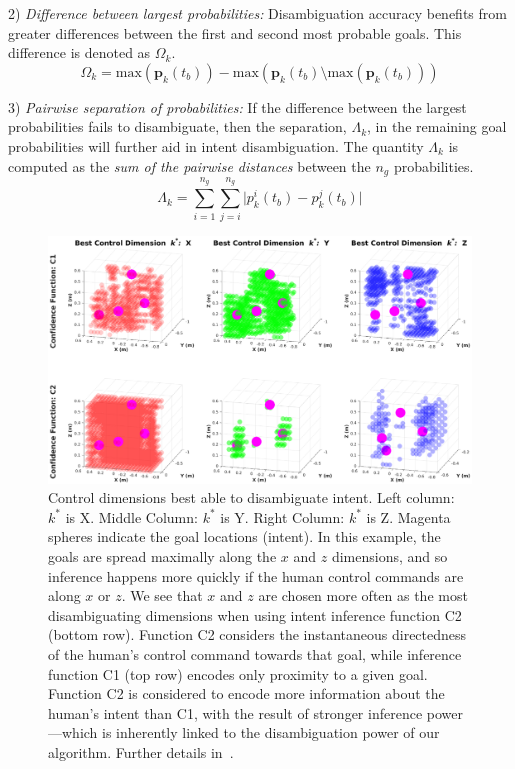 \documentclass[natbib, twocolumn]{svjour3}          %
\begin{document}
2) \textit{Difference between largest probabilities:} Disambiguation accuracy benefits from greater differences between the first and second most probable goals. This difference is denoted as $\Omega_k$.
\begin{equation}
\Omega_k = \text{max}(\boldsymbol{p}_k(t_b)) - \text{max}(\boldsymbol{p}_k(t_b) \setminus \text{max}(\boldsymbol{p}_k(t_b)))
\end{equation}

3) \textit{Pairwise separation of probabilities:} If the difference between the largest probabilities fails to disambiguate, then the separation, $\Lambda_k$, in the remaining goal probabilities will further aid in intent disambiguation. The quantity $\Lambda_k$ is computed as the \textit{sum of the pairwise distances} between the $n_g$ probabilities.
\begin{equation}
\Lambda_k = \sum_{i=1}^{n_g}\sum_{j=i}^{n_g}\lvert p^i_k(t_b) - p^j_k(t_b)\rvert
\end{equation}
\begin{figure}[t]
	\centering
	\includegraphics[width = 1.15\hsize, height = 0.45\vsize, center]{Fig4.eps}
	\caption{Control dimensions best able to disambiguate intent.  Left column: $k^*$ is X. Middle Column: $k^*$ is Y. Right Column: $k^*$ is Z. Magenta spheres indicate the goal locations (intent). In this example, the goals are spread maximally along the $x$ and $z$ dimensions, and so inference happens more quickly if the human control commands are along $x$ or $z$. We see that $x$ and $z$ are chosen more often as the most disambiguating dimensions when using intent inference function C2 (bottom row). Function C2 considers the instantaneous directedness of the human's control command towards that goal, while inference function C1 (top row) encodes only proximity to a given goal. Function C2 is considered to encode more information about the human's intent than C1, with the result of stronger inference power---which is inherently linked to the disambiguation power of our algorithm. Further details in~\citep{gopinath2017mode}.}
	\label{fig:sim_res}
\end{figure}
\end{document}
